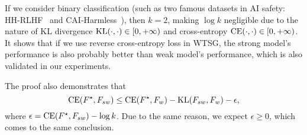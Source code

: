 If we consider binary classification (such as two famous datasets in AI safety: HH-RLHF~\citep{bai2022training} and CAI-Harmless~\citep{bai2022constitutional}), then $k=2$, making $\log k$ negligible due to the nature of KL divergence $\mathrm{KL}(\cdot, \cdot) \in [0, +\infty)$ and cross-entropy $\mathrm{CE}(\cdot, \cdot) \in [0, +\infty)$.
It shows that if we use reverse cross-entropy loss in WTSG, the strong model's performance is also probably better than weak model's performance, which is also validated in our experiments.


\begin{remark}
The proof also demonstrates that 
$$\mathrm{CE}(F^\star, F_{sw}) \le \mathrm{CE}(F^\star, F_w) - \mathrm{KL}(F_{sw}, F_w) - \epsilon,$$
where $\epsilon=\mathrm{CE}(F^\star,F_{sw}) - \log k$. Due to the same reason, we expect $\epsilon \ge 0$, which comes to the same conclusion.
\end{remark}







